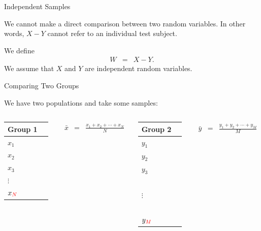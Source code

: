 \begin{frame}{Independent Samples}
  
  \vfill

  We cannot make a direct comparison between two random variables. In
  other words, $X-Y$ cannot refer to an individual test subject.

  \vfill

  We define 
  \begin{eqnarray*}
    W & = & X - Y.
  \end{eqnarray*}
  We assume that $X$ and $Y$ are independent random variables.


  \vfill

\end{frame}


\begin{frame}{Comparing Two Groups}

  We have two populations and take some samples: \\
  \begin{columns}
    \begin{tabular}{ll}
      Group 1 \\ \hline
      $x_1$  \\
      $x_2$  \\
      $x_3$  \\
      $\vdots$ \\
      $x_{{\color{red}N}}$  \\
    \end{tabular}

    \begin{eqnarray*}
      \bar{x} & = & \frac{x_1+x_2+\cdots+x_N}{N}
    \end{eqnarray*}

    \begin{tabular}{ll}
      Group 2 \\ \hline
      $y_1$ \\
      $y_2$ \\
      $y_3$ \\
      ~ \\
      $\vdots$ \\
      ~ \\
      $y_{{\color{red}M}}$ \\
    \end{tabular}

    \begin{eqnarray*}
      \bar{y} & = & \frac{y_1+y_2+\cdots+y_M}{M}
    \end{eqnarray*}


  \end{columns}

  \vfill


  \vfill

\end{frame}


